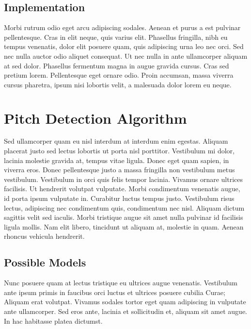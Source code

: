 
\subsection{Implementation}
Morbi rutrum odio eget arcu adipiscing sodales. Aenean et purus a est pulvinar pellentesque. Cras in elit neque, quis varius elit. Phasellus fringilla, nibh eu tempus venenatis, dolor elit posuere quam, quis adipiscing urna leo nec orci. Sed nec nulla auctor odio aliquet consequat. Ut nec nulla in ante ullamcorper aliquam at sed dolor. Phasellus fermentum magna in augue gravida cursus. Cras sed pretium lorem. Pellentesque eget ornare odio. Proin accumsan, massa viverra cursus pharetra, ipsum nisi lobortis velit, a malesuada dolor lorem eu neque.


\section{Pitch Detection Algorithm}

Sed ullamcorper quam eu nisl interdum at interdum enim egestas. Aliquam placerat justo sed lectus lobortis ut porta nisl porttitor. Vestibulum mi dolor, lacinia molestie gravida at, tempus vitae ligula. Donec eget quam sapien, in viverra eros. Donec pellentesque justo a massa fringilla non vestibulum metus vestibulum. Vestibulum in orci quis felis tempor lacinia. Vivamus ornare ultrices facilisis. Ut hendrerit volutpat vulputate. Morbi condimentum venenatis augue, id porta ipsum vulputate in. Curabitur luctus tempus justo. Vestibulum risus lectus, adipiscing nec condimentum quis, condimentum nec nisl. Aliquam dictum sagittis velit sed iaculis. Morbi tristique augue sit amet nulla pulvinar id facilisis ligula mollis. Nam elit libero, tincidunt ut aliquam at, molestie in quam. Aenean rhoncus vehicula hendrerit.

\subsection{Possible Models}

Nunc posuere quam at lectus tristique eu ultrices augue venenatis. Vestibulum ante ipsum primis in faucibus orci luctus et ultrices posuere cubilia Curae; Aliquam erat volutpat. Vivamus sodales tortor eget quam adipiscing in vulputate ante ullamcorper. Sed eros ante, lacinia et sollicitudin et, aliquam sit amet augue. In hac habitasse platea dictumst.

